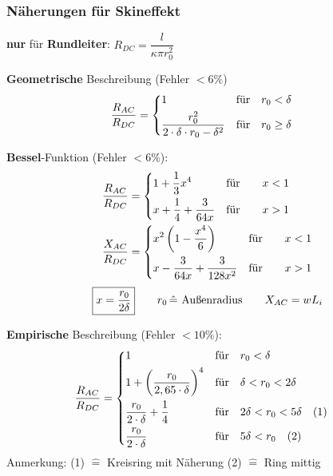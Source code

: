 \subsubsection{Näherungen für Skineffekt}
\textbf{nur} für \textbf{Rundleiter}: $ R_{DC} = \dfrac{l}{\kappa \pi r_0^2}$
\begin{description}
	\item \textbf{Geometrische} Beschreibung (Fehler $ < 6\% $)
	      \begin{align*}
		      \frac{R_{AC}}{R_{DC}} & =
		      \begin{dcases}
			      1                                                & \text{für} \quad r_0 < \delta    \\
			      \frac{r_0^2}{2\cdot \delta \cdot r_0 - \delta^2} & \text{für} \quad r_0 \geq \delta
		      \end{dcases}
	      \end{align*}

	\item \textbf{Bessel}-Funktion (Fehler $ < 6 \% $):
	      \begin{align*}
		      \frac{R_{AC}}{R_{DC}} & =
		      \begin{dcases}
			      1 + \frac{1}{3}x^4              & \text{für} \qquad x < 1 \\
			      x + \frac{1}{4} + \frac{3}{64x} & \text{für} \qquad x > 1 \\
		      \end{dcases} \\
		      \frac{X_{AC}}{R_{DC}} & =
		      \begin{dcases}
			      x^2\left( 1-\frac{x^4}{6} \right)   & \text{für} \qquad x < 1 \\
			      x- \frac{3}{64x} + \frac{3}{128x^2} & \text{für} \qquad x > 1 \\
		      \end{dcases}
	      \end{align*}
	      \[
		      \boxed{x=\frac{r_0}{2\delta}} \qquad r_0 \, \hat{=} \textnormal{ Außenradius} \qquad X_{AC} = wL_i
	      \]

	\item \textbf{Empirische} Beschreibung (Fehler $ < 10\% $):
	      \begin{align*}
		      \frac{R_{AC}}{R_{DC}} & =
		      \begin{dcases}
			      1                                                & \text{für} \quad r_0 < \delta                      \\
			      1+ \left( \frac{r_0}{2,65\cdot \delta} \right)^4 & \text{für} \quad \delta < r_0 < 2\delta            \\
			      \frac{r_0}{2 \cdot\delta} + \frac{1}{4}          & \text{für} \quad 2\delta < r_0 < 5\delta \quad (1) \\
			      \frac{r_0}{2\cdot \delta}                        & \text{für} \quad 5\delta < r_0 \quad (2)
		      \end{dcases}
	      \end{align*}
	      \footnotesize Anmerkung: (1) $\widehat{=}$ Kreisring mit Näherung \quad
	      (2) $\widehat{=}$ Ring mittig
\end{description}

